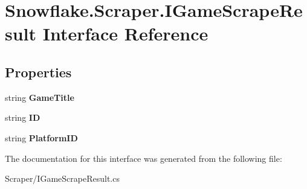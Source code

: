 \hypertarget{interface_snowflake_1_1_scraper_1_1_i_game_scrape_result}{}\section{Snowflake.\+Scraper.\+I\+Game\+Scrape\+Result Interface Reference}
\label{interface_snowflake_1_1_scraper_1_1_i_game_scrape_result}
\subsection*{Properties}
\begin{DoxyCompactItemize}
\item 
\hypertarget{interface_snowflake_1_1_scraper_1_1_i_game_scrape_result_a4f50b5cc838d753c900b2be5562c2b8c}{}string {\bfseries Game\+Title}\label{interface_snowflake_1_1_scraper_1_1_i_game_scrape_result_a4f50b5cc838d753c900b2be5562c2b8c}

\item 
\hypertarget{interface_snowflake_1_1_scraper_1_1_i_game_scrape_result_afb1f9b93e49e8f00be08da0844d4259c}{}string {\bfseries I\+D}\label{interface_snowflake_1_1_scraper_1_1_i_game_scrape_result_afb1f9b93e49e8f00be08da0844d4259c}

\item 
\hypertarget{interface_snowflake_1_1_scraper_1_1_i_game_scrape_result_a4afe93d0e4e63bc9584d7e1b2437d9b3}{}string {\bfseries Platform\+I\+D}\label{interface_snowflake_1_1_scraper_1_1_i_game_scrape_result_a4afe93d0e4e63bc9584d7e1b2437d9b3}

\end{DoxyCompactItemize}


The documentation for this interface was generated from the following file\+:\begin{DoxyCompactItemize}
\item 
Scraper/I\+Game\+Scrape\+Result.\+cs\end{DoxyCompactItemize}
